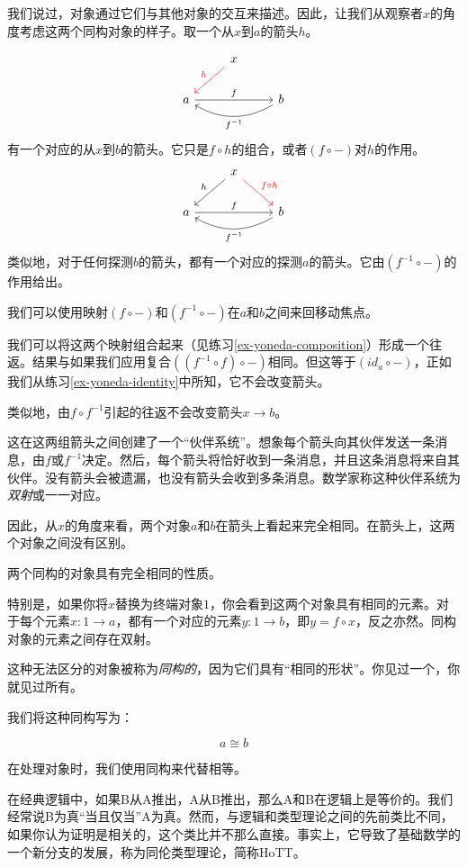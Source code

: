 \documentclass[DaoFP]{subfiles}
\begin{document}
我们说过，对象通过它们与其他对象的交互来描述。因此，让我们从观察者$x$的角度考虑这两个同构对象的样子。取一个从$x$到$a$的箭头$h$。

\[
 \begin{tikzcd}
 & x
 \arrow[ld, red, "h"']
 \\
 a
 \arrow[rr, "f"]
  && b
 \arrow[ll, bend left,  "f^{-1}"]
 \end{tikzcd}
\]
有一个对应的从$x$到$b$的箭头。它只是$f \circ h$的组合，或者$(f \circ -)$对$h$的作用。
\[
 \begin{tikzcd}
 & x
 \arrow[ld, "h"']
 \arrow[rd, red, "f \circ h"]
 \\
 a
 \arrow[rr, "f"]
  && b
 \arrow[ll, bend left,  "f^{-1}"]
 \end{tikzcd}
\]
类似地，对于任何探测$b$的箭头，都有一个对应的探测$a$的箭头。它由$(f^{-1} \circ -)$的作用给出。

我们可以使用映射$(f \circ -)$和$(f^{-1} \circ -)$在$a$和$b$之间来回移动焦点。

我们可以将这两个映射组合起来（见练习\ref{ex-yoneda-composition}）形成一个往返。结果与如果我们应用复合$((f^{-1} \circ f) \circ -)$相同。但这等于$(id_a \circ  -)$，正如我们从练习\ref{ex-yoneda-identity}中所知，它不会改变箭头。

类似地，由$f \circ f^{-1}$引起的往返不会改变箭头$x \to b$。

这在这两组箭头之间创建了一个“伙伴系统”。想象每个箭头向其伙伴发送一条消息，由$f$或$f^{-1}$决定。然后，每个箭头将恰好收到一条消息，并且这条消息将来自其伙伴。没有箭头会被遗漏，也没有箭头会收到多条消息。数学家称这种伙伴系统为\emph{双射}或一一对应。

因此，从$x$的角度来看，两个对象$a$和$b$在箭头上看起来完全相同。在箭头上，这两个对象之间没有区别。

两个同构的对象具有完全相同的性质。

特别是，如果你将$x$替换为终端对象$1$，你会看到这两个对象具有相同的元素。对于每个元素$x \colon 1 \to a$，都有一个对应的元素$y \colon 1 \to b$，即$y = f \circ x$，反之亦然。同构对象的元素之间存在双射。

这种无法区分的对象被称为\emph{同构的}，因为它们具有“相同的形状”。你见过一个，你就见过所有。

我们将这种同构写为：

\[a \cong b\]

在处理对象时，我们使用同构来代替相等。

在经典逻辑中，如果B从A推出，A从B推出，那么A和B在逻辑上是等价的。我们经常说B为真“当且仅当”A为真。然而，与逻辑和类型理论之间的先前类比不同，如果你认为证明是相关的，这个类比并不那么直接。事实上，它导致了基础数学的一个新分支的发展，称为同伦类型理论，简称HoTT。
\end{document}
